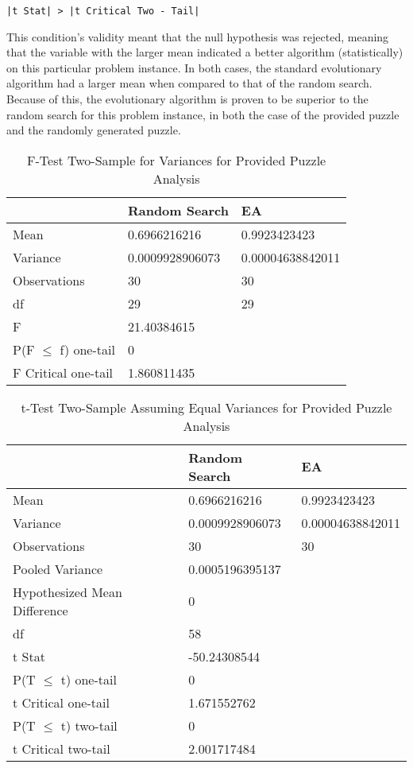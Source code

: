 \documentclass[11pt]{article}
\begin{document}
\begin{center}
\texttt{|t Stat| > |t Critical Two - Tail|}
\end{center}

This condition's validity meant that the null hypothesis was rejected, meaning that the 
variable with the larger mean indicated a better algorithm (statistically) on this 
particular problem instance. In both cases, the standard evolutionary algorithm had a 
larger mean when compared to that of the random search. Because of this, the 
evolutionary algorithm is proven to be superior to the random search for this problem 
instance, in both the case of the provided puzzle and the randomly generated puzzle.


\begin{table}[H]
\centering
\caption{F-Test Two-Sample for Variances for Provided Puzzle Analysis}
\label{my-label}
\begin{tabular}{l|l|l}
 & Random Search & EA \\ \hline
Mean & 0.6966216216 & 0.9923423423 \\
Variance & 0.0009928906073 & 0.00004638842011 \\
Observations & 30 & 30 \\
df & 29 & 29 \\
F & 21.40384615 &  \\
P(F $\leq$ f) one-tail & 0 &  \\
F Critical one-tail & 1.860811435 & 
\end{tabular}
\end{table}


\begin{table}[H]
\centering
\caption{t-Test Two-Sample Assuming Equal Variances for Provided Puzzle Analysis}
\label{my-label}
\begin{tabular}{l|l|l}
 & Random Search & EA \\ \hline
Mean & 0.6966216216 & 0.9923423423 \\
Variance & 0.0009928906073 & 0.00004638842011 \\
Observations & 30 & 30 \\
Pooled Variance & 0.0005196395137 &  \\
Hypothesized Mean Difference & 0 &  \\
df & 58 &  \\
t Stat & -50.24308544 &  \\
P(T $\leq$ t) one-tail & 0 &  \\
t Critical one-tail & 1.671552762 &  \\
P(T $\leq$ t) two-tail & 0 &  \\
t Critical two-tail & 2.001717484 &
\end{tabular}
\end{table}
\end{document}
